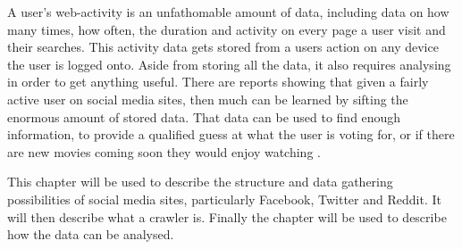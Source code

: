 A user's web-activity is an unfathomable amount of data, including data on how
many times, how often, the duration and activity on every page a user visit and
their searches. This activity data gets stored from a users action on any device
the user is logged onto. Aside from storing all the data, it also requires
analysing in order to get anything useful.
There are reports showing that given a fairly active user on social media sites,
then much can be learned by sifting the enormous amount of stored data. That
data can be used to find enough information, to provide a qualified guess at
what the user is voting for, or if there are new movies coming soon they would
enjoy watching \citep{Personality}.\nl

This chapter will be used to describe the structure and data gathering
possibilities of social media sites, particularly Facebook, Twitter and Reddit.
It will then describe what a crawler is. Finally the chapter will be used to
describe how the data can be analysed.
